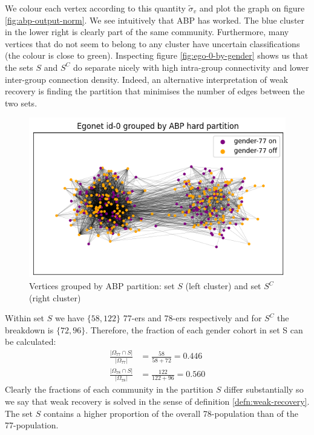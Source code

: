 \documentclass[11pt]{article}
\newcommand{\figwidth}{0.8\linewidth}
\begin{document}
\begin{multicols*}{2}
We colour each vertex according to this quantity $\tilde{\sigma}_v$ and plot the graph on figure \ref{fig:abp-output-norm}. We see intuitively that ABP has worked. The blue cluster in the lower right is clearly part of the same community. Furthermore, many vertices that do not seem to belong to any cluster have uncertain classifications (the colour is close to green). Inspecting figure \ref{fig:ego-0-by-gender} shows us that the sets $S$ and $S^C$ do separate nicely with high intra-group connectivity and lower inter-group connection density. Indeed, an alternative interpretation of weak recovery is finding the partition that minimises the number of edges between the two sets.
%
\begin{figure}[H]
	\centering
	\includegraphics[width=\figwidth]{ego-0-abp-by-gender.png}
	\caption{Vertices grouped by ABP partition: set $S$ (left cluster) and set $S^C$ (right cluster)}
	\label{fig:abp-output-by-gender}
\end{figure}

Within set $S$ we have $\{58, 122\}$ 77-ers and 78-ers respectively and for $S^C$ the breakdown is $\{72, 96\}$. Therefore, the fraction of each gender cohort in set S can be calculated:
%
\begin{equation}
	\begin{aligned}
	\frac{|\Omega_{77} \cap S|}{|\Omega_{77}|} &= \frac{58}{58+72} = 0.446 \\
	\frac{|\Omega_{78} \cap S|}{|\Omega_{78}|} &= \frac{122}{122+96} = 0.560
	\end{aligned}
\end{equation}
%
Clearly the fractions of each community in the partition $S$ differ substantially so we say that weak recovery is solved in the sense of definition \ref{defn:weak-recovery}. The set $S$ contains a higher proportion of the overall 78-population than of the 77-population.


\end{multicols*}
\end{document}
